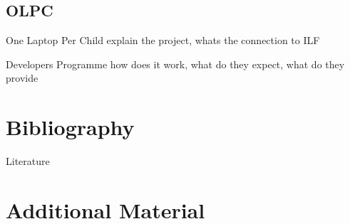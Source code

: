 \documentclass[compress]{beamer}
\begin{document}
\subsection{OLPC}

\begin{frame}{One Laptop Per Child}
explain the project, whats the connection to ILF
\end{frame}

\begin{frame}{Developers Programme}
how does it work, what do they expect, what do they provide
\end{frame}



\appendix
{}


\section{Bibliography}
\begin{frame}[allowframebreaks]{Literature}
\tiny{}
\end{frame}

\section{Additional Material}
\begin{frame}

\end{frame}
\end{document}

